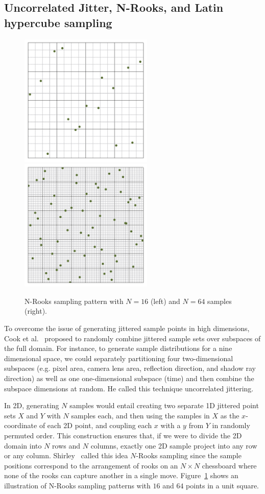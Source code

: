 \documentclass[11pt,fleqn]{book} %
\begin{document}
\subsection{Uncorrelated Jitter, N-Rooks, and Latin hypercube sampling}
%
\begin{figure}[ht]
  \centering
  \includegraphics[width=2.5in]{Pictures/pointset-gridvisualize/points-nrooks-n16.pdf}
    \includegraphics[width=2.5in]{./Pictures/pointset-gridvisualize/points-nrooks-n64.pdf}
  \caption{N-Rooks sampling pattern with $N=16$ (left) and $N = 64$ samples (right).}
  \label{fig:nrooks}
\end{figure}
%
To overcome the issue of generating jittered sample points in high dimensions, Cook et al.~\cite{Cook:1984:DRT} proposed to randomly combine jittered sample sets over subspaces of the full domain. For instance, to generate sample distributions for a nine dimensional space, we could separately partitioning four two-dimensional subspaces (e.g. pixel area, camera lens area, reflection direction, and shadow ray direction) as well as one one-dimensional subspace (time) and then combine the subspace dimensions at random. He called this technique uncorrelated jittering.

In 2D, generating $N$ samples would entail creating two separate 1D jittered point sets $X$ and $Y$ with $N$ samples each, and then using the samples in $X$ as the $x$-coordinate of each 2D point, and coupling each $x$ with a $y$ from $Y$ in randomly permuted order. This construction ensures that, if we were to divide the 2D domain into $N$ rows and $N$ columns, exactly one 2D sample project into any row or any column. Shirley~\cite{Shirley91-DQMSD} called this idea $N$-Rooks sampling since the sample positions correspond to the arrangement of rooks on an $N\times N$ chessboard where none of the rooks can capture another in a single move. Figure~\ref{fig:nrooks} shows an illustration of N-Rooks sampling patterns with $16$ and $64$ points in a unit square.
\end{document}
